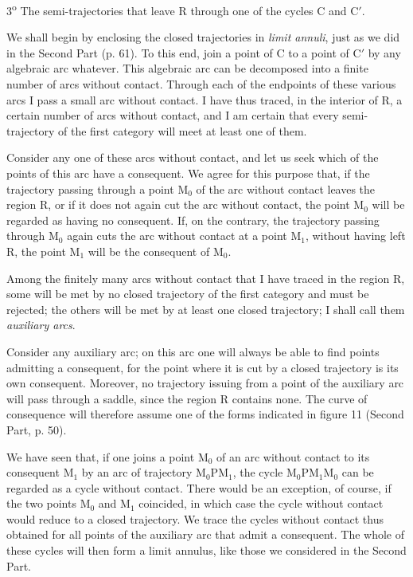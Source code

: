 \documentclass[11pt]{article}
\begin{document}
3\textsuperscript{o} The semi-trajectories that leave R through one of the cycles C and C$'$.

We shall begin by enclosing the closed trajectories in \emph{limit annuli}, just as we did in the Second Part (p. 61). To this end, join a point of C to a point of C$'$ by any algebraic arc whatever. This algebraic arc can be decomposed into a finite number of arcs without contact. Through each of the endpoints of these various arcs I pass a small arc without contact. I have thus traced, in the interior of R, a certain number of arcs without contact, and I am certain that every semi-trajectory of the first category will meet at least one of them.

Consider any one of these arcs without contact, and let us seek which of the points of this arc have a consequent. We agree for this purpose that, if the trajectory passing through a point $\mathrm{M}_0$ of the arc without contact leaves the region R, or if it does not again cut the arc without contact, the point $\mathrm{M}_0$ will be regarded as having no consequent. If, on the contrary, the trajectory passing through $\mathrm{M}_0$ again cuts the arc without contact at a point $\mathrm{M}_1$, without having left R, the point $\mathrm{M}_1$ will be the consequent of $\mathrm{M}_0$.

Among the finitely many arcs without contact that I have traced in the region R, some will be met by no closed trajectory of the first category and must be rejected; the others will be met by at least one closed trajectory; I shall call them \emph{auxiliary arcs}.

Consider any auxiliary arc; on this arc one will always be able to find points admitting a consequent, for the point where it is cut by a closed trajectory is its own consequent. Moreover, no trajectory issuing from a point of the auxiliary arc will pass through a saddle, since the region R contains none. The curve of consequence will therefore assume one of the forms indicated in figure 11 (Second Part, p. 50).

We have seen that, if one joins a point $\mathrm{M}_0$ of an arc without contact to its consequent $\mathrm{M}_1$ by an arc of trajectory $\mathrm{M}_0\mathrm{P}\mathrm{M}_1$, the cycle $\mathrm{M}_0\mathrm{P}\mathrm{M}_1\mathrm{M}_0$ can be regarded as a cycle without contact. There would be an exception, of course, if the two points $\mathrm{M}_0$ and $\mathrm{M}_1$ coincided, in which case the cycle without contact would reduce to a closed trajectory. We trace the cycles without contact thus obtained for all points of the auxiliary arc that admit a consequent. The whole of these cycles will then form a limit annulus, like those we considered in the Second Part.
\end{document}
